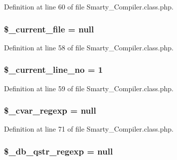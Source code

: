 \-Definition at line 60 of file \-Smarty\-\_\-\-Compiler.\-class.\-php.

\hypertarget{class_smarty___compiler_a4c6ef40a0c9534d4c25ec77cd4e8d388}{
\subsubsection[{\$\-\_\-current\-\_\-file}]{\setlength{\rightskip}{0pt plus 5cm}\$\-\_\-current\-\_\-file = null}}\label{class_smarty___compiler_a4c6ef40a0c9534d4c25ec77cd4e8d388}


\-Definition at line 58 of file \-Smarty\-\_\-\-Compiler.\-class.\-php.

\hypertarget{class_smarty___compiler_ac9f9994f6a399d7a682d828324e153b2}{
\subsubsection[{\$\-\_\-current\-\_\-line\-\_\-no}]{\setlength{\rightskip}{0pt plus 5cm}\$\-\_\-current\-\_\-line\-\_\-no = 1}}\label{class_smarty___compiler_ac9f9994f6a399d7a682d828324e153b2}


\-Definition at line 59 of file \-Smarty\-\_\-\-Compiler.\-class.\-php.

\hypertarget{class_smarty___compiler_a970ef1136e2d145f672aeedae5e28642}{
\subsubsection[{\$\-\_\-cvar\-\_\-regexp}]{\setlength{\rightskip}{0pt plus 5cm}\$\-\_\-cvar\-\_\-regexp = null}}\label{class_smarty___compiler_a970ef1136e2d145f672aeedae5e28642}


\-Definition at line 71 of file \-Smarty\-\_\-\-Compiler.\-class.\-php.

\hypertarget{class_smarty___compiler_a08f3b03133a4c421b057ed0fbe9fde1f}{
\subsubsection[{\$\-\_\-db\-\_\-qstr\-\_\-regexp}]{\setlength{\rightskip}{0pt plus 5cm}\$\-\_\-db\-\_\-qstr\-\_\-regexp = null}}\label{class_smarty___compiler_a08f3b03133a4c421b057ed0fbe9fde1f}


